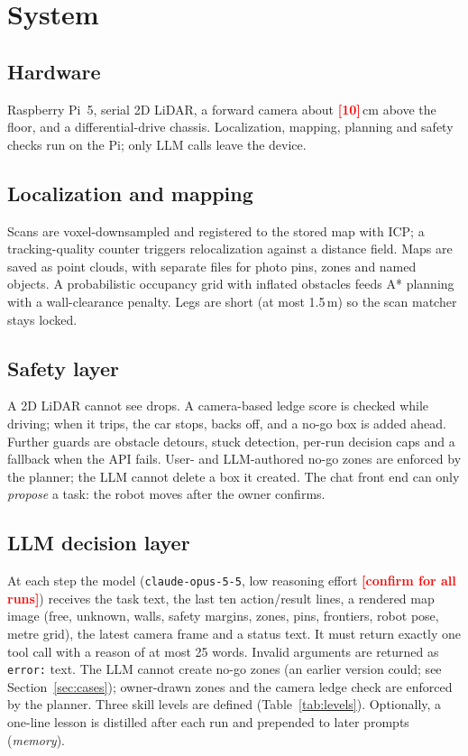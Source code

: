 \documentclass[conference]{IEEEtran}
\newcommand{\todo}[1]{\textcolor{red}{\textbf{[#1]}}}
\begin{document}
\section{System}
\subsection{Hardware}
Raspberry Pi~5, serial 2D LiDAR, a forward camera about \todo{10}\,cm above the floor, and a differential-drive chassis. Localization, mapping, planning and safety checks run on the Pi; only LLM calls leave the device.

\subsection{Localization and mapping}
Scans are voxel-downsampled and registered to the stored map with ICP; a tracking-quality counter triggers relocalization against a distance field. Maps are saved as point clouds, with separate files for photo pins, zones and named objects.
A probabilistic occupancy grid with inflated obstacles feeds A* planning with a wall-clearance penalty. Legs are short (at most 1.5\,m) so the scan matcher stays locked.

\subsection{Safety layer}
A 2D LiDAR cannot see drops. A camera-based ledge score is checked while driving; when it trips, the car stops, backs off, and a no-go box is added ahead.
Further guards are obstacle detours, stuck detection, per-run decision caps and a fallback when the API fails. User- and LLM-authored no-go zones are enforced by the planner; the LLM cannot delete a box it created.
The chat front end can only \emph{propose} a task: the robot moves after the owner confirms.

\subsection{LLM decision layer}
At each step the model (\texttt{claude-opus-5-5}, low reasoning effort \todo{confirm for all runs}) receives the task text, the last ten action/result lines, a rendered map image (free, unknown, walls, safety margins, zones, pins, frontiers, robot pose, metre grid), the latest camera frame and a status text.
It must return exactly one tool call with a reason of at most 25 words. Invalid arguments are returned as \texttt{error:} text.
The LLM cannot create no-go zones (an earlier version could; see Section~\ref{sec:cases}); owner-drawn zones and the camera ledge check are enforced by the planner. Three skill levels are defined (Table~\ref{tab:levels}). Optionally, a one-line lesson is distilled after each run and prepended to later prompts (\emph{memory}).
\end{document}
